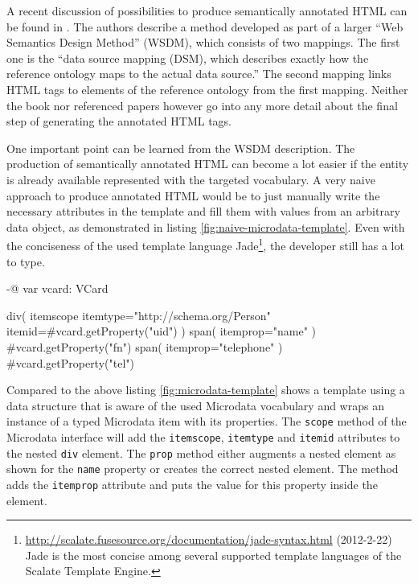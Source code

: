 \documentclass[11pt,a4paper,headsepline,twoside]{scrartcl}		%
\newcommand{\citeurl}[2]{\url{#1} (#2)}
\begin{document}
A recent discussion of possibilities to produce semantically annotated HTML can
be found in \cite[sec. 9.1.3]{DBLP:books/daglib/0023755}. The authors describe a
method developed as part of a larger ``Web Semantics Design Method'' (WSDM),
which consists of two mappings. The first one is the ``data source mapping
(DSM), which describes exactly how the reference ontology maps to the actual
data source.''  The second mapping links HTML tags to elements of the reference
ontology from the first mapping. Neither the book nor referenced papers however
go into any more detail about the final step of generating the annotated HTML
tags.

One important point can be learned from the WSDM description. The production of
semantically annotated HTML can become a lot easier if the entity is already
available represented with the targeted vocabulary. A very naive approach to
produce annotated HTML would be to just manually write the necessary attributes
in the template and fill them with values from an arbitrary data object, as
demonstrated in listing \ref{fig:naive-microdata-template}. Even with the
conciseness of the used template language
Jade\footnote{\citeurl{http://scalate.fusesource.org/documentation/jade-syntax.html}{2012-2-22}
  Jade is the most concise among several supported template languages of the
  Scalate Template Engine.}, the developer still has a lot to type.

\begin{anylisting}[label=fig:naive-microdata-template,
                   caption={Defining all Microdata attributes manually in an HTML template}]
-@ var vcard: VCard

div( itemscope itemtype="http://schema.org/Person" 
     itemid=#{vcard.getProperty("uid")} )
  span( itemprop="name" )
    #{vcard.getProperty("fn")}
  span( itemprop="telephone" ) 
    #{vcard.getProperty("tel")}
\end{anylisting}

Compared to the above listing \ref{fig:microdata-template} shows a template
using a data structure that is aware of the used Microdata vocabulary and wraps
an instance of a typed Microdata item with its properties. The
\lstinline:scope: method of the Microdata interface will add the
\lstinline:itemscope:, \lstinline:itemtype: and \lstinline:itemid: attributes to
the nested \lstinline:div: element. The \lstinline:prop: method either augments
a nested element as shown for the \lstinline:name: property or creates the
correct nested element. The method adds the \lstinline:itemprop: attribute and
puts the value for this property inside the element.
\end{document}
